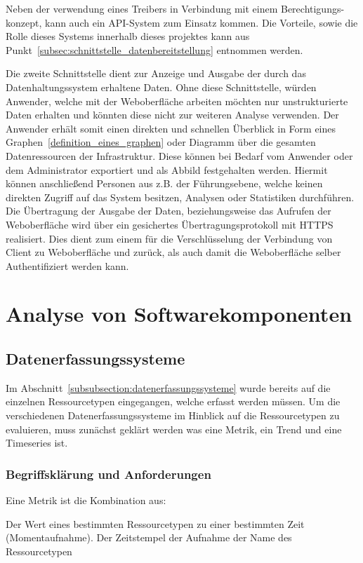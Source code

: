 Neben der verwendung eines Treibers in Verbindung mit einem Berechtigungs-
konzept, kann auch ein API-System zum Einsatz kommen. Die Vorteile, sowie die
Rolle dieses Systems innerhalb dieses projektes kann aus
Punkt~\ref{subsec:schnittstelle_datenbereitstellung} entnommen werden.

Die zweite Schnittstelle dient zur Anzeige und Ausgabe der durch das
Datenhaltungssystem erhaltene Daten. Ohne diese Schnittstelle, würden Anwender,
welche mit der Weboberfläche arbeiten möchten nur unstrukturierte Daten
erhalten und könnten diese nicht zur weiteren Analyse verwenden. Der Anwender
erhält somit einen direkten und schnellen Überblick in Form eines
Graphen~\ref{definition_eines_graphen} oder Diagramm über die gesamten
Datenressourcen der Infrastruktur. Diese können bei Bedarf vom Anwender oder
dem Administrator exportiert und als Abbild festgehalten werden. Hiermit können
anschließend Personen aus z.B. der Führungsebene, welche keinen direkten
Zugriff auf das System besitzen, Analysen oder Statistiken durchführen. Die
Übertragung der Ausgabe der Daten, beziehungsweise das Aufrufen der
Weboberfläche wird über ein gesichertes Übertragungsprotokoll mit HTTPS
realisiert. Dies dient zum einem für die Verschlüsselung der Verbindung von
Client zu Weboberfläche und zurück, als auch damit die Weboberfläche selber
Authentifiziert werden kann.
\mr%

\section{Analyse von Softwarekomponenten}
\subsection{Datenerfassungssysteme}
Im Abschnitt~\ref{subsubsection:datenerfassungssysteme} wurde bereits auf die
einzelnen Ressourcetypen eingegangen, welche erfasst werden müssen. Um die
verschiedenen Datenerfassungssysteme im Hinblick auf die Ressourcetypen zu
evaluieren, muss zunächst geklärt werden was eine Metrik, ein Trend und eine
Timeseries ist.
\tm%

\subsubsection{Begriffsklärung und Anforderungen}
\label{subsubsection:Begriffserklärung}
Eine Metrik ist die Kombination aus:

\begin{outline}
  \1 Der Wert eines bestimmten Ressourcetypen zu einer bestimmten Zeit
  (Momentaufnahme).
  \1 Der Zeitstempel der Aufnahme
  \1 der Name des Ressourcetypen
\end{outline}

